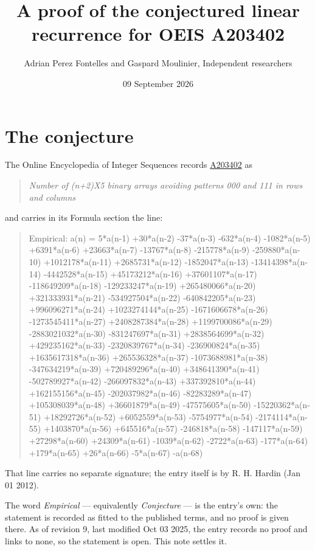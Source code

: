 \documentclass[11pt]{article}
\title{A proof of the conjectured linear recurrence for OEIS A203402}
\author{Adrian Perez Fontelles and Gaspard Moulinier, Independent researchers}
\date{09 September 2026}
\theoremstyle{definition}
\begin{document}
\maketitle
\section{The conjecture}

The Online Encyclopedia of Integer Sequences records \href{https://oeis.org/A203402}{A203402} as

\begin{quote}\itshape Number of (n+2)X5 binary arrays avoiding patterns 000 and 111 in rows and columns\end{quote}

and carries in its Formula section the line:

\begin{quote}\ttfamily Empirical: a(n) = 5*a(n-1) +30*a(n-2) -37*a(n-3) -632*a(n-4) -1082*a(n-5) +6391*a(n-6) +23663*a(n-7) -13767*a(n-8) -215778*a(n-9) -259880*a(n-10) +1012178*a(n-11) +2685731*a(n-12) -1852047*a(n-13) -13414398*a(n-14) -4442528*a(n-15) +45173212*a(n-16) +37601107*a(n-17) -118649209*a(n-18) -129233247*a(n-19) +265480066*a(n-20) +321333931*a(n-21) -534927504*a(n-22) -640842205*a(n-23) +996096271*a(n-24) +1023274144*a(n-25) -1671606678*a(n-26) -1273545411*a(n-27) +2408287384*a(n-28) +1199700086*a(n-29) -2883021032*a(n-30) -831247697*a(n-31) +2838564699*a(n-32) +429235162*a(n-33) -2320839767*a(n-34) -236900824*a(n-35) +1635617318*a(n-36) +265536328*a(n-37) -1073688981*a(n-38) -347634219*a(n-39) +720489296*a(n-40) +348641390*a(n-41) -502789927*a(n-42) -266097832*a(n-43) +337392810*a(n-44) +162155156*a(n-45) -202037982*a(n-46) -82283289*a(n-47) +105308039*a(n-48) +36601879*a(n-49) -47575605*a(n-50) -15220362*a(n-51) +18292726*a(n-52) +6052559*a(n-53) -5754977*a(n-54) -2174114*a(n-55) +1403870*a(n-56) +645516*a(n-57) -246818*a(n-58) -147117*a(n-59) +27298*a(n-60) +24309*a(n-61) -1039*a(n-62) -2722*a(n-63) -177*a(n-64) +179*a(n-65) +26*a(n-66) -5*a(n-67) -a(n-68)\end{quote}

That line carries no separate signature; the entry itself is by R. H. Hardin (Jan 01 2012).

The word {\itshape Empirical} --- equivalently {\itshape Conjecture} --- is the entry's own: the statement is recorded as fitted to the published terms, and no proof is given there. As of revision 9, last modified Oct 03 2025, the entry records no proof and links to none, so the statement is open. This note settles it.
\end{document}
